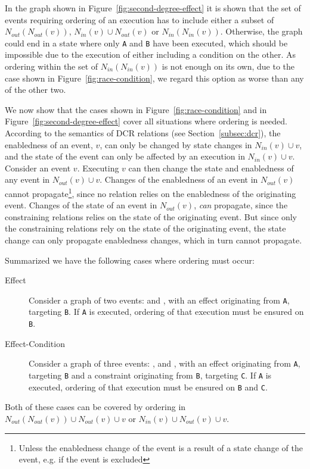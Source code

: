 \documentclass{article}
\begin{document}
	In the graph shown in Figure~\ref{fig:second-degree-effect} it is shown that the set of events requiring ordering of an execution has to include either a subset of $N_{out}(N_{out}(v))$, $N_{in}(v) \cup N_{out}(v)$ or $N_{in}(N_{in}(v))$.
	Otherwise, the graph could end in a state where only \texttt{A} and \texttt{B} have been executed, which should be impossible due to the execution of either including a condition on the other.
	As ordering within the set of $N_{in}(N_{in}(v))$ is not enough on its own, due to the case shown in Figure~\ref{fig:race-condition}, we regard this option as worse than any of the other two.

	We now show that the cases shown in Figure~\ref{fig:race-condition} and in Figure~\ref{fig:second-degree-effect} cover all situations where ordering is needed.
	According to the semantics of DCR relations (see Section~\ref{subsec:dcr}), the enabledness of an event, $v$, can only be changed by state changes in $N_{in}(v) \cup v$, and the state of the event can only be affected by an execution in $N_{in}(v) \cup v$.
	Consider an event $v$.
	Executing $v$ can then change the state and enabledness of any event in $N_{out}(v) \cup v$.
	Changes of the enabledness of an event in $N_{out}(v)$ cannot propagate\footnote{Unless the enabledness change of the event is a result of a state change of the event, e.g. if the event is excluded}, since no relation relies on the enabledness of the originating event.
	Changes of the state of an event in $N_{out}(v)$, \textit{can} propagate, since the constraining relations relies on the state of the originating event.
	But since only the constraining relations rely on the state of the originating event, the state change can only propagate enabledness changes, which in turn cannot propagate.

	Summarized we have the following cases where ordering must occur:
	\begin{description}
		\item[Effect] Consider a graph of two events:  and , with an effect originating from \texttt{A}, targeting \texttt{B}.
		If \texttt{A} is executed, ordering of that execution must be ensured on \texttt{B}.
		\item[Effect-Condition] Consider a graph of three events: ,  and , with an effect originating from \texttt{A}, targeting \texttt{B} and a constraint originating from \texttt{B}, targeting \texttt{C}.
		If \texttt{A} is executed, ordering of that execution must be ensured on \texttt{B} and \texttt{C}.
	\end{description}
	Both of these cases can be covered by ordering in $N_{out}(N_{out}(v)) \cup N_{out}(v) \cup v$ or $N_{in}(v) \cup N_{out}(v) \cup v$.
\end{document}
